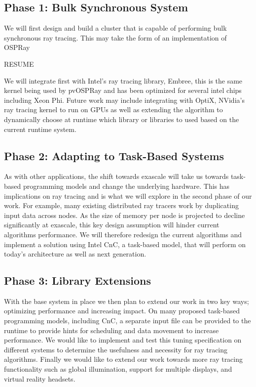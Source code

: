\documentclass[12pt]{article}
\begin{document}
\subsection*{Phase 1: Bulk Synchronous System}

We will first design and build a cluster that is capable of performing
bulk synchronous ray tracing. This may take the form of an implementation
of OSPRay

RESUME

We will integrate first with Intel's ray tracing library, Embree, this is the same kernel being used by pvOSPRay and has been optimized for several intel chips including Xeon Phi.  Future work may include integrating with OptiX, NVidia's ray tracing kernel to run on GPUs as well as extending the algorithm to dynamically choose at runtime which library or libraries to used based on the current runtime system.

\subsection*{Phase 2: Adapting to Task-Based Systems}

As with other applications, the shift towards exascale will take us towards task-based programming models and change the underlying hardware.  This has implications on ray tracing and is what we will explore in the second phase of our work.  For example, many existing distributed ray tracers work by duplicating input data across nodes.  As the size of memory per node is projected to decline significantly at exascale, this key design assumption will hinder current algorithms performance.  We will therefore redesign the current algorithms and implement a solution using Intel CnC, a task-based model, that will perform on today's architecture as well as next generation.  

\subsection*{Phase 3: Library Extensions}

With the base system in place we then plan to extend our work in two key ways; optimizing performance and increasing impact.  On many proposed task-based programming models, including CnC, a separate input file can be provided to the runtime to provide hints for scheduling and data movement to increase performance.  We would like to implement and test this tuning specification on different systems to determine the usefulness and necessity for ray tracing algorithms.  Finally we would like to extend our work towards more ray tracing functionality such as global illumination, support for multiple displays, and virtual reality headsets.
\end{document}

